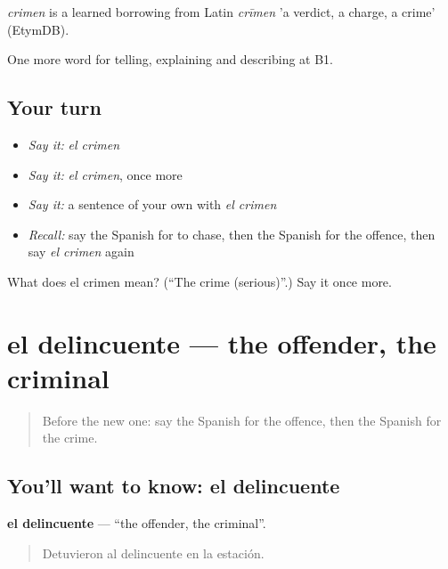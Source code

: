 \begin{cousinweb}
\emph{crimen} is a learned borrowing from Latin \emph{crīmen} 'a verdict, a charge, a crime' (EtymDB).
\end{cousinweb}

\begin{grammarlens}[title={What you've built}]
One more word for telling, explaining and describing at B1.
\end{grammarlens}

\subsection*{Your turn}
\begin{itemize}
\raggedright
  \item \emph{Say it:} \emph{el crimen}
  \item \emph{Say it:} \emph{el crimen}, once more
  \item \emph{Say it:} a sentence of your own with \emph{el crimen}
  \item \emph{Recall:} say the Spanish for to chase, then the Spanish for the offence, then say \emph{el crimen} again
\end{itemize}

\begin{tcolorbox}[breakable,colback=teal!4,colframe=teal!35!black,title={Before you move on}]
What does el crimen mean? (\textquotedblleft{}The crime (serious)\textquotedblright{}.) Say it once more.
\end{tcolorbox}
\section[el delincuente]{el delincuente — the offender, the criminal}

\label{lesson:ES-C520-delincuente}



\begin{quote}
Before the new one: say the Spanish for the offence, then the Spanish for the crime.
\end{quote}

\subsection*{You'll want to know: el delincuente}
\textbf{el delincuente} — \textquotedblleft{}the offender, the criminal\textquotedblright{}.

\begin{quote}
Detuvieron al delincuente en la estación.
\end{quote}

